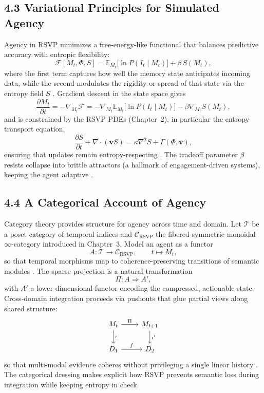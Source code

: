 \documentclass[12pt]{article}
\begin{document}
\subsection*{4.3 Variational Principles for Simulated Agency}

Agency in RSVP minimizes a free-energy-like functional that balances predictive accuracy with entropic flexibility:
\[
\mathcal{F}[M_t, \Phi, S] 
= \mathbb{E}_{M_t}\big[ \ln P(I_t \mid M_t) \big] + \beta\, S(M_t),
\]
where the first term captures how well the memory state anticipates incoming data, while the second modulates the rigidity or spread of that state via the entropy field \(S\) \citep{friston2010}. Gradient descent in the state space gives
\[
\frac{\partial M_t}{\partial t}
= -\nabla_{M_t} \mathcal{F}
= -\nabla_{M_t} \mathbb{E}_{M_t}\big[ \ln P(I_t \mid M_t) \big]
  - \beta \nabla_{M_t} S(M_t),
\]
and is constrained by the RSVP PDEs (Chapter~2), in particular the entropy transport equation,
\[
\frac{\partial S}{\partial t} + \nabla \cdot (\mathbf{v} S) 
= \kappa \nabla^2 S + \Gamma(\Phi,\mathbf{v}),
\]
ensuring that updates remain entropy-respecting \citep{jaynes2003}. The tradeoff parameter \(\beta\) resists collapse into brittle attractors (a hallmark of engagement-driven systems), keeping the agent adaptive \citep{hohwy2013, lanier2018}.

\subsection*{4.4 A Categorical Account of Agency}

Category theory provides structure for agency across time and domain. Let \(\mathcal{T}\) be a poset category of temporal indices and \(\mathcal{C}_{\text{RSVP}}\) the fibered symmetric monoidal \(\infty\)-category introduced in Chapter~3. Model an agent as a functor
\[
A : \mathcal{T} \to \mathcal{C}_{\text{RSVP}}, \qquad t \mapsto M_t,
\]
so that temporal morphisms map to coherence-preserving transitions of semantic modules \citep{lawvere2009, maclane1998}. The sparse projection is a natural transformation
\[
\Pi : A \Rightarrow A',
\]
with \(A'\) a lower-dimensional functor encoding the compressed, actionable state. Cross-domain integration proceeds via pushouts that glue partial views along shared structure:
\[
\begin{tikzcd}
M_t \arrow[r, "\Pi"] \arrow[d, "\iota"] & M_{t+1} \arrow[d, "\iota'"] \\
D_1 \arrow[r, "f"] & D_2
\end{tikzcd}
\]
so that multi-modal evidence coheres without privileging a single linear history \citep{may1999}. The categorical dressing makes explicit how RSVP prevents semantic loss during integration while keeping entropy in check.
\end{document}
